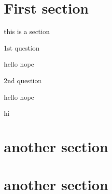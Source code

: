 \documentclass[noquestionbreak]{../../skrexam}  %
\begin{document}
\pagestyle{headandfoot}
\runningheader{}{\resizebox{\textwidth}{!}{\HeaderDescription}}{}

\runningheadrule


\section{First section}\noindent

this is a section


\begin{questions}
	\question
	1st question
	\begin{choices}
	\choice hello
	\choice nope
	\end{choices}
	
	\question 2nd question
	\begin{choices}
	\choice hello
	\choice nope
	\end{choices}
\end{questions}


hi

\section{another section}
\newpage

\section{another section}

\setcounter{totalpages}{\value{page}}
\setcounter{totalsections}{\value{section}}
\end{document}
